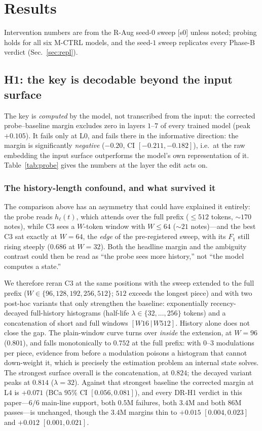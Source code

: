 \documentclass[conference]{IEEEtran}
\begin{document}
\section{Results}
\label{sec:results}
Intervention numbers are from the R-Aug seed-$0$ sweep [s0] unless noted; probing
holds for all six M-CTRL models, and the seed-$1$ sweep replicates every Phase-B
verdict (Sec.~\ref{sec:repl}).

\subsection{H1: the key is decodable beyond the input surface}
\label{sec:resultsA}
The key is \emph{computed} by the model, not transcribed from the input: the
corrected probe--baseline margin excludes zero in layers $1$--$7$ of every trained
model (peak $+0.105$). It fails only at L$0$, and fails there in the informative
direction: the margin is significantly \emph{negative} ($-0.20$, CI
$[-0.211,-0.182]$), i.e.\ at the raw embedding the input surface outperforms the
model's own representation of it. Table~\ref{tab:probe} gives
the numbers at the layer the edit acts on.

\subsubsection{The history-length confound, and what survived it}
\label{sec:extD}
The comparison above has an asymmetry that could have explained it entirely: the
probe reads $h_\ell(t)$, which attends over the full prefix ($\le512$ tokens,
${\sim}170$ notes), while C3 sees a $W$-token window with $W\le64$ (${\sim}21$
notes)---and the best C3 sat exactly at $W{=}64$, the \emph{edge} of the
pre-registered sweep, with its $F_1$ still rising steeply ($0.686$ at $W{=}32$).
Both the headline margin and the ambiguity contrast could then be read as
``the probe sees more history,'' not ``the model computes a state.''

We therefore reran C3 at the same positions with the sweep extended to the full
prefix ($W\in\{96,128,192,256,512\}$; $512$ exceeds the longest piece) and with two
post-hoc variants that only strengthen the baseline: exponentially recency-decayed
full-history histograms (half-life $\lambda\in\{32,\ldots,256\}$ tokens) and a
concatenation of short and full windows $[W16\,|\,W512]$. History alone does not
close the gap. The plain-window curve turns over \emph{inside} the extension, at
$W{=}96$ ($0.801$), and falls monotonically to $0.752$ at the full prefix: with
$0$--$3$ modulations per piece, evidence from before a modulation poisons a
histogram that cannot down-weight it, which is precisely the estimation problem an
internal state solves. The strongest surface overall is the concatenation, at
$0.824$; the decayed variant peaks at $0.814$ ($\lambda{=}32$). Against that
strongest baseline the corrected margin at L$4$ is $+0.071$ (BCa $95\%$ CI
$[0.056,0.081]$), and every DR-H1 verdict in this paper---$6/6$ main-line support,
both $0.5$M failures, both $3.4$M and both $86$M passes---is unchanged, though the
$3.4$M margins thin to $+0.015$ $[0.004,0.023]$ and $+0.012$ $[0.001,0.021]$.
\end{document}

